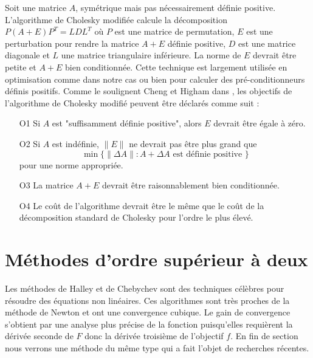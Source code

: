 Soit une matrice $A$, sym\'etrique mais pas n\'ecessairement d\'efinie positive. L'algorithme de Cholesky modifi\'ee
calcule la d\'ecomposition $P(A+E)P^T=LDL^T$ o\`u $P$ est une matrice de permutation, $E$ est une
perturbation pour rendre la matrice $A+E$ d\'efinie positive, $D$ est une matrice diagonale et
$L$ une matrice triangulaire inf\'erieure. La norme de $E$ devrait être petite et $A+E$
bien conditionn\'ee. Cette technique est largement utilis\'ee en optimisation comme dans notre cas ou bien pour
calculer des pr\'e-conditionneurs d\'efinis positifs.
Comme le soulignent Cheng et Higham dans \cite{Higham}, les objectifs de l'algorithme de Cholesky modifi\'e peuvent être d\'eclar\'es
comme suit :
\begin{itemize}
\item[O1] Si $A$ est "suffisamment d\'efinie positive", alors $E$ devrait être \'egale \`a z\'ero.
\item[O2] Si $A$ est ind\'efinie, $\lVert E \rVert$ ne devrait pas être plus grand que
\[\min\{\lVert \Delta A \rVert: A+\Delta A \text{ est d\'efinie positive } \} \]
pour une norme appropri\'ee.
\item[O3] La matrice $A+E$ devrait être raisonnablement bien conditionn\'ee.
\item[O4] Le coût de l'algorithme devrait être le même que le coût de la d\'ecomposition standard de Cholesky
 pour l'ordre le plus \'elev\'e.
\end{itemize}











\section{M\'ethodes d'ordre sup\'erieur \`a deux}
Les m\'ethodes de Halley et de Chebychev sont des techniques c\'el\`ebres pour r\'esoudre des \'equations non lin\'eaires. Ces algorithmes
sont tr\`es proches de la m\'ethode de Newton et ont une convergence cubique. Le gain de convergence s'obtient par une analyse
plus pr\'ecise de la fonction puisqu'elles requi\`erent la d\'eriv\'ee seconde de $F$ donc la d\'eriv\'ee troisi\`eme de l'objectif $f$.
En fin de section nous verrons une m\'ethode du même type qui a fait l'objet de recherches r\'ecentes.

